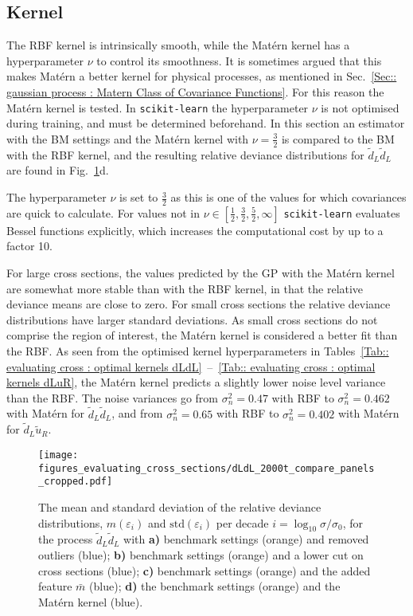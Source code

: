 \documentclass[twoside,english]{uiofysmaster}
\begin{document}
{{\subsection{Kernel}

The RBF kernel is intrinsically smooth, while the Mat\'{e}rn kernel has a hyperparameter $\nu$ to control its smoothness. It is sometimes argued that this makes Mat\'{e}rn a better kernel for physical processes, as mentioned in Sec.~\ref{Sec:: gaussian process : Matern Class of Covariance Functions}. For this reason the Mat\'{e}rn kernel is tested. In \verb|scikit-learn| the hyperparameter $\nu$ is not optimised during training, and must be determined beforehand. In this section an estimator with the BM settings and the Mat\'{e}rn kernel with $\nu=\frac{3}{2}$ is compared to the BM with the RBF kernel, and the resulting relative deviance distributions for $\widetilde{d}_L \widetilde{d}_L$ are found in Fig.~\ref{Fig:: evaluating cross : RD compare panels dLdL}d. 

The hyperparameter $\nu$ is set to $\frac{3}{2}$ as this is one of the values for which covariances are quick to calculate. For values not in $\nu \in [\frac{1}{2}, \frac{3}{2}, \frac{5}{2}, \infty]$ \verb|scikit-learn| evaluates Bessel functions explicitly, which increases the computational cost by up to a factor 10. 

For large cross sections, the values predicted by the GP with the Mat\'{e}rn kernel are somewhat more stable than with the RBF kernel, in that the relative deviance means are close to zero. For small cross sections the relative deviance distributions have larger standard deviations. As small cross sections do not comprise the region of interest, the Mat\'{e}rn kernel is considered a better fit than the RBF. As seen from the optimised kernel hyperparameters in Tables~\ref{Tab:: evaluating cross : optimal kernels dLdL}~--~\ref{Tab:: evaluating cross : optimal kernels dLuR}, the Mat\'{e}rn kernel predicts a slightly lower noise level variance than the RBF. The noise variances go from $\sigma_n^2 = 0.47$ with RBF to $\sigma_n^2 = 0.462$ with Mat\'{e}rn for $\widetilde{d}_L \widetilde{d}_L$, and from $\sigma_n^2 = 0.65$ with RBF to $\sigma_n^2 = 0.402$ with Mat\'{e}rn for $\widetilde{d}_L \widetilde{u}_R$. 

\begin{figure}
\texttt{[image: figures\_evaluating\_cross\_sections/dLdL\_2000t\_compare\_panels\_cropped.pdf]}
\caption{The mean and standard deviation of the relative deviance distributions, $m(\varepsilon_i)$ and $\mathrm{std}(\varepsilon_i)$ per decade $i=\log_{10} \sigma/ \sigma_0$, for the process $\widetilde{d}_L \widetilde{d}_L$ with \textbf{a)} benchmark settings (orange) and removed outliers (blue); \textbf{b)} benchmark settings (orange) and a lower cut on cross sections (blue); \textbf{c)} benchmark settings (orange) and the added feature $\bar{m}$ (blue); \textbf{d)} the benchmark settings (orange) and the Mat\'{e}rn kernel (blue).}
\label{Fig:: evaluating cross : RD compare panels dLdL}
\end{figure}

}}
\end{document}
